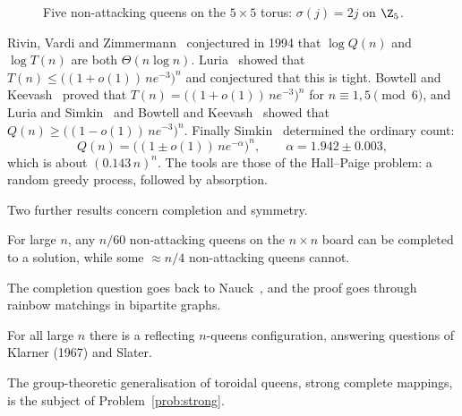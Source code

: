 \begin{figure}[ht]
\centering

\caption{Five non-attacking queens on the $5\times5$ torus: $\sigma(j)=2j$ on $\Z_5$.}
\label{fig:toroidal-queens}
\end{figure}


Rivin, Vardi and Zimmermann~\cite{rvz94} conjectured in 1994 that $\log Q(n)$ and $\log T(n)$ are both $\Theta(n\log n)$. Luria~\cite{lur17} showed that $T(n)\leq\bigl((1+o(1))\,ne^{-3}\bigr)^n$ and conjectured that this is tight. Bowtell and Keevash~\cite{bk21} proved that $T(n)=\bigl((1+o(1))\,ne^{-3}\bigr)^n$ for $n\equiv1,5\pmod6$, and Luria and Simkin~\cite{ls21} and Bowtell and Keevash~\cite{bk21} showed that $Q(n)\geq\bigl((1-o(1))\,ne^{-3}\bigr)^n$. Finally Simkin~\cite{sim21} determined the ordinary count:
\[
Q(n)=\bigl((1\pm o(1))\,ne^{-\alpha}\bigr)^n,\qquad \alpha=1.942\pm0.003,
\]
which is about $(0.143\,n)^n$. The tools are those of the Hall--Paige problem: a random greedy process, followed by absorption.

Two further results concern completion and symmetry.

\begin{theorem}\label{thm:completion}
For large $n$, any $n/60$ non-attacking queens on the $n\times n$ board can be completed to a solution, while some $\approx n/4$ non-attacking queens cannot.
\end{theorem}

The completion question goes back to Nauck~\cite{nau1850}, and the proof goes through rainbow matchings in bipartite graphs.

\begin{theorem}\label{thm:reflecting}
For all large $n$ there is a reflecting $n$-queens configuration, answering questions of Klarner (1967) and Slater.
\end{theorem}

The group-theoretic generalisation of toroidal queens, strong complete mappings, is the subject of Problem~\ref{prob:strong}.
